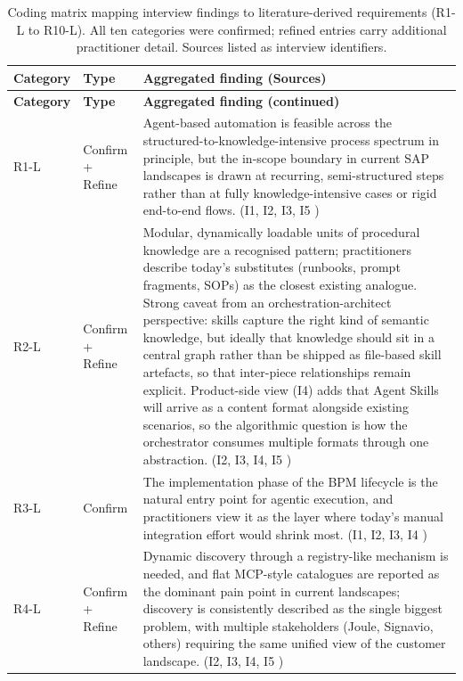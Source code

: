 \setlength{\LTleft}{0pt}\setlength{\LTright}{0pt}
\renewcommand{\arraystretch}{1.4}
\footnotesize
\begin{longtable}{@{} p{1.4cm} p{3.0cm} p{\dimexpr\textwidth-4.8cm\relax} @{}}
\caption{Coding matrix mapping interview findings to literature-derived requirements (R1-L to R10-L). All ten categories were confirmed; refined entries carry additional practitioner detail. Sources listed as interview identifiers.}
\label{tab:interview-coding}\\
\toprule
\textbf{Category} & \textbf{Type} & \textbf{Aggregated finding (Sources)} \\
\midrule
\endfirsthead
\toprule
\textbf{Category} & \textbf{Type} & \textbf{Aggregated finding (continued)} \\
\midrule
\endhead
\bottomrule
\endlastfoot
R1-L  & Confirm + Refine & Agent-based automation is feasible across the structured-to-knowledge-intensive process spectrum in principle, but the in-scope boundary in current SAP landscapes is drawn at recurring, semi-structured steps rather than at fully knowledge-intensive cases or rigid end-to-end flows. (I1, I2, I3, I5 ) \\
\midrule
R2-L  & Confirm + Refine & Modular, dynamically loadable units of procedural knowledge are a recognised pattern; practitioners describe today's substitutes (runbooks, prompt fragments, SOPs) as the closest existing analogue. Strong caveat from an orchestration-architect perspective: skills capture the right kind of semantic knowledge, but ideally that knowledge should sit in a central graph rather than be shipped as file-based skill artefacts, so that inter-piece relationships remain explicit. Product-side view (I4) adds that Agent Skills will arrive as a content format alongside existing scenarios, so the algorithmic question is how the orchestrator consumes multiple formats through one abstraction. (I2, I3, I4, I5 ) \\
\midrule
R3-L  & Confirm & The implementation phase of the BPM lifecycle is the natural entry point for agentic execution, and practitioners view it as the layer where today's manual integration effort would shrink most. (I1, I2, I3, I4 ) \\
\midrule
R4-L  & Confirm + Refine & Dynamic discovery through a registry-like mechanism is needed, and flat MCP-style catalogues are reported as the dominant pain point in current landscapes; discovery is consistently described as the single biggest problem, with multiple stakeholders (Joule, Signavio, others) requiring the same unified view of the customer landscape. (I2, I3, I4, I5 ) \\

\end{longtable}
